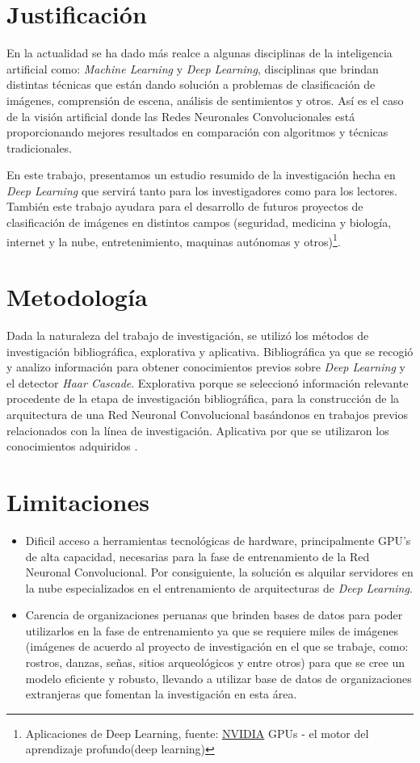 \section{Justificación}
En la actualidad se ha dado más realce a algunas disciplinas de la inteligencia artificial como: \textit{Machine Learning} y \textit{Deep Learning}, disciplinas que brindan distintas técnicas que están dando solución a problemas de clasificación de imágenes, comprensión de escena, análisis de sentimientos y otros. Así es el caso de la visión artificial donde las Redes Neuronales Convolucionales está proporcionando mejores resultados en comparación con algoritmos y técnicas tradicionales.

En este trabajo, presentamos un estudio resumido de la investigación hecha en \textit{Deep Learning} que servirá tanto para los investigadores como para los lectores. También este trabajo ayudara para el desarrollo de futuros proyectos de clasificación de imágenes en distintos campos (seguridad, medicina y biología, internet y la nube, entretenimiento, maquinas autónomas y otros)\footnote[4]{Aplicaciones de Deep Learning, fuente: \href{https://developer.nvidia.com/deep-learning}{NVIDIA} GPUs - el motor del aprendizaje profundo(deep learning)}.


\section{Metodología}
Dada la naturaleza del trabajo de investigación, se utilizó los métodos de investigación bibliográfica, explorativa y aplicativa. Bibliográfica ya que se recogió y analizo información para obtener conocimientos previos sobre \textit{Deep Learning} y el detector \textit{Haar Cascade}. Explorativa porque se seleccionó información relevante procedente de la etapa de investigación bibliográfica, para la construcción de la arquitectura de una Red Neuronal Convolucional basándonos en trabajos previos relacionados con la línea de investigación. Aplicativa por que se utilizaron los conocimientos adquiridos \cite{19sabino1994hacer}\cite{23silva2001metodologia}.


\section{Limitaciones}
\begin{itemize}
\item Dificil acceso a herramientas tecnológicas de hardware, principalmente GPU's de alta capacidad, necesarias para la fase de entrenamiento de la Red Neuronal Convolucional. Por consiguiente, la solución es alquilar servidores en la nube especializados en el entrenamiento de arquitecturas de \textit{Deep Learning}.
\item Carencia de organizaciones peruanas que brinden bases de datos para poder utilizarlos en la fase de entrenamiento ya que se requiere miles de imágenes (imágenes de acuerdo al proyecto de investigación en el que se trabaje, como: rostros, danzas, señas, sitios arqueológicos y entre otros) para que se cree un modelo eficiente y robusto, llevando a utilizar base de datos de organizaciones extranjeras que fomentan la investigación en esta área.
\end{itemize}
\newpage
